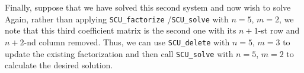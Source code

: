 \documentclass{galahad}
\newcommand{\packagename}{SCU}
\begin{document}
Finally, suppose that we have solved this second system and now wish 
to solve 
Again, rather than applying {\tt \packagename\_factorize} /{\tt \packagename\_solve} 
with $n = 5$, $m = 2$, we note 
that this third coefficient matrix is the second one with its 
$n + 1$-st row and $n + 2$-nd column removed. Thus, we can use 
{\tt \packagename\_delete} with $n = 5$, $m = 3$ to update the existing factorization 
and then call 
{\tt \packagename\_solve} with $n = 5$, $m = 2$ to calculate the desired solution. 
\end{document}
